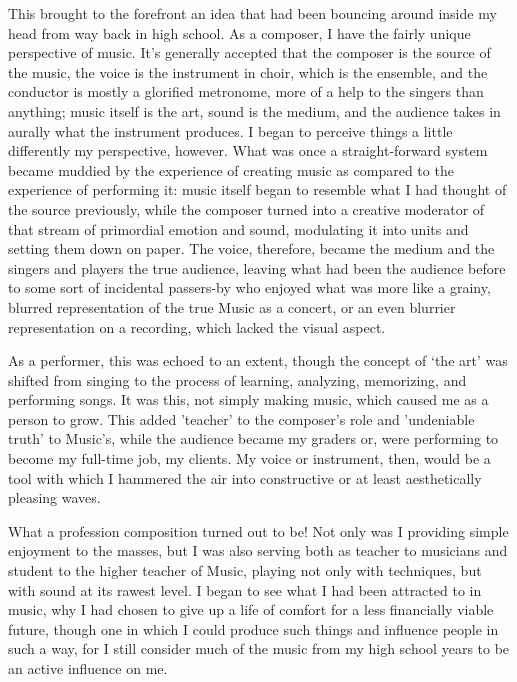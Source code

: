 This brought to the forefront an idea that had been bouncing around inside my head from way back in high school. As a composer, I have the fairly unique perspective of music. It's generally accepted that the composer is the source of the music, the voice is the instrument in choir, which is the ensemble, and the conductor is mostly a glorified metronome, more of a help to the singers than anything; music itself is the art, sound is the medium, and the audience takes in aurally what the instrument produces. I began to perceive things a little differently my perspective, however. What was once a straight-forward system became muddied by the experience of creating music as compared to the experience of performing it: music itself began to resemble what I had thought of the source previously, while the composer turned into a creative moderator of that stream of primordial emotion and sound, modulating it into units and setting them down on paper. The voice, therefore, became the medium and the singers and players the true audience, leaving what had been the audience before to some sort of incidental passers-by who enjoyed what was more like a grainy, blurred representation of the true Music as a concert, or an even blurrier representation on a recording, which lacked the visual aspect.

As a performer, this was echoed to an extent, though the concept of `the art' was shifted from singing to the process of learning, analyzing, memorizing, and performing songs. It was this, not simply making music, which caused me as a person to grow. This added 'teacher' to the composer's role and 'undeniable truth' to Music's, while the audience became my graders or, were performing to become my full-time job, my clients. My voice or instrument, then, would be a tool with which I hammered the air into constructive or at least aesthetically pleasing waves.

What a profession composition turned out to be! Not only was I providing simple enjoyment to the masses, but I was also serving both as teacher to musicians and student to the higher teacher of Music, playing not only with techniques, but with sound at its rawest level. I began to see what I had been attracted to in music, why I had chosen to give up a life of comfort for a less financially viable future, though one in which I could produce such things and influence people in such a way, for I still consider much of the music from my high school years to be an active influence on me.

